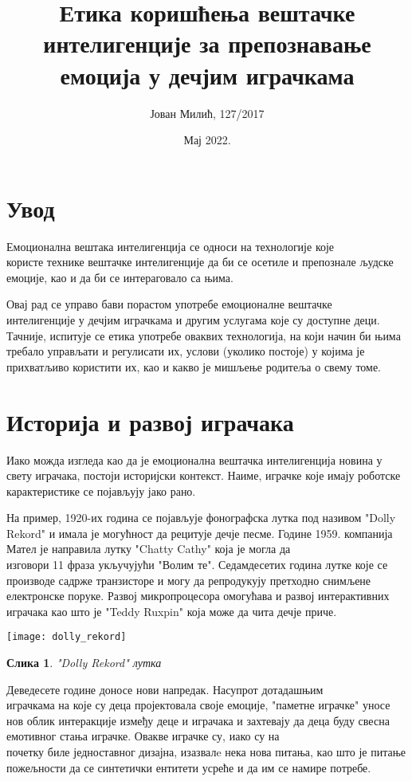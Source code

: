 \documentclass{article}
\title{Етика коришћења вештачке интелигенције за препознавање емоција у дечјим играчкама}
\author{Јован Милић, 127/2017 }
\date{Мај 2022.}
\newtheorem{image}{Слика}
\begin{document}
\maketitle

\justifying
\section{Увод}


Емоционална вештака интелигенција се односи на технологије које \\користе технике вештачке интелигенције да би се осетиле и препознале људске емоције, као и да би се интераговало са њима. 

Овај рад се управо бави порастом употребе емоционалне вештачке \\интелигенције у дечјим играчкама и другим услугама које су доступне деци. Тачније, испитује се етика употребе оваквих технологија, на који начин би њима требало управљати и регулисати их, услови (уколико постоје) у којима је прихватљиво користити их, као и какво је мишљење родитеља о свему томе.  

\section{Историја и развој играчака}
Иако можда изгледа као да је емоционална вештачка интелигенција новина у свету играчака, постоји историјски контекст. Наиме, играчке које имају роботске карактеристике се појављују јако рано. 

На пример, 1920-их година се појављује фонографска лутка под називом "Dolly Rekord" и имала је могућност да рецитује дечје песме. Године 1959. компанија Мател је направила лутку "Chatty Cathy" која је могла да \\изговори 11 фраза укључујући "Волим те". Седамдесетих година лутке које се производе садрже транзисторе и могу да репродукују претходно снимљене електронске поруке. Развој микропроцесора омогућава и развој интерактивних играчака као што је "Teddy Ruxpin" која може да чита дечје приче. 

\texttt{[image: dolly\_rekord]}
\begin{image}
\centering
"Dolly Rekord" лутка
\end{image}

Деведесете године доносе нови напредак. Насупрот дотадашњим \\играчкама на које су деца пројектовала своје емоције, "паметне играчке" уносе нов облик интеракције између деце и играчака и захтевају да деца буду свесна емотивног стања играчке. Овакве играчке су, иако су на \\почетку биле једноставног дизајна, изазвалe нека нова питања, као што је питање пожељности да се синтетички ентитети усреће и да им се намире потребе. 
\end{document}
